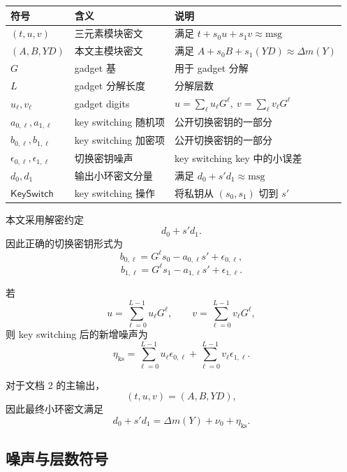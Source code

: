 \documentclass[11pt]{article}
\newcommand{\KS}{\mathsf{KeySwitch}}
\begin{document}
\begin{center}
\begin{tabular}{lll}
\toprule
符号 & 含义 & 说明 \\
\midrule
\((t,u,v)\) & 三元素模块密文 & 满足 \(t+s_0u+s_1v\approx \mathrm{msg}\) \\
\((A,B,YD)\) & 本文主模块密文 & 满足 \(A+s_0B+s_1(YD)\approx \Delta m(Y)\) \\
\(G\) & gadget 基 & 用于 gadget 分解 \\
\(L\) & gadget 分解长度 & 分解层数 \\
\(u_\ell,v_\ell\) & gadget digits & \(u=\sum_\ell u_\ell G^\ell,\ v=\sum_\ell v_\ell G^\ell\) \\
\(a_{0,\ell},a_{1,\ell}\) & key switching 随机项 & 公开切换密钥的一部分 \\
\(b_{0,\ell},b_{1,\ell}\) & key switching 加密项 & 公开切换密钥的一部分 \\
\(\epsilon_{0,\ell},\epsilon_{1,\ell}\) & 切换密钥噪声 & key switching key 中的小误差 \\
\(d_0,d_1\) & 输出小环密文分量 & 满足 \(d_0+s'd_1\approx \mathrm{msg}\) \\
\(\KS\) & key switching 操作 & 将私钥从 \((s_0,s_1)\) 切到 \(s'\) \\
\bottomrule
\end{tabular}
\end{center}

本文采用解密约定
\[
d_0+s'd_1.
\]
因此正确的切换密钥形式为
\[
b_{0,\ell}=G^\ell s_0-a_{0,\ell}s'+\epsilon_{0,\ell},
\]
\[
b_{1,\ell}=G^\ell s_1-a_{1,\ell}s'+\epsilon_{1,\ell}.
\]

若
\[
u=\sum_{\ell=0}^{L-1}u_\ell G^\ell,
\qquad
v=\sum_{\ell=0}^{L-1}v_\ell G^\ell,
\]
则 key switching 后的新增噪声为
\[
\eta_{\mathrm{ks}}
=
\sum_{\ell=0}^{L-1}u_\ell\epsilon_{0,\ell}
+
\sum_{\ell=0}^{L-1}v_\ell\epsilon_{1,\ell}.
\]

对于文档 2 的主输出，
\[
(t,u,v)=(A,B,YD),
\]
因此最终小环密文满足
\[
d_0+s'd_1
=
\Delta m(Y)+\nu_0+\eta_{\mathrm{ks}}.
\]

\subsection{噪声与层数符号}
\end{document}
